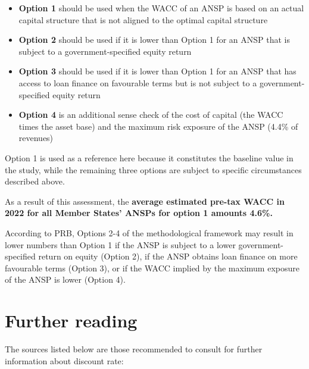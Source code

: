 \documentclass[
  11pt,
  a4paper,
]{book}
\begin{document}
\begin{itemize}
\item
  \textbf{Option 1} should be used when the WACC of an ANSP is based on
  an actual capital structure that is not aligned to the optimal capital
  structure
\item
  \textbf{Option 2} should be used if it is lower than Option 1 for an
  ANSP that is subject to a government-specified equity return
\item
  \textbf{Option 3} should be used if it is lower than Option 1 for an
  ANSP that has access to loan finance on favourable terms but is not
  subject to a government-specified equity return
\item
  \textbf{Option 4} is an additional sense check of the cost of capital
  (the WACC times the asset base) and the maximum risk exposure of the
  ANSP (4.4\% of revenues)
\end{itemize}

Option 1 is used as a reference here because it constitutes the baseline
value in the study, while the remaining three options are subject to
specific circumstances described above.

As a result of this assessment, the \textbf{average estimated pre-tax
WACC in 2022 for all Member States' ANSPs for option 1 amounts 4.6\%.}

According to PRB, Options 2-4 of the methodological framework may result
in lower numbers than Option 1 if the ANSP is subject to a lower
government-specified return on equity (Option 2), if the ANSP obtains
loan finance on more favourable terms (Option 3), or if the WACC implied
by the maximum exposure of the ANSP is lower (Option 4).

\hypertarget{further-reading-4}{%
\section{Further reading}\label{further-reading-4}}

The sources listed below are those recommended to consult for further
information about discount rate:
\end{document}
